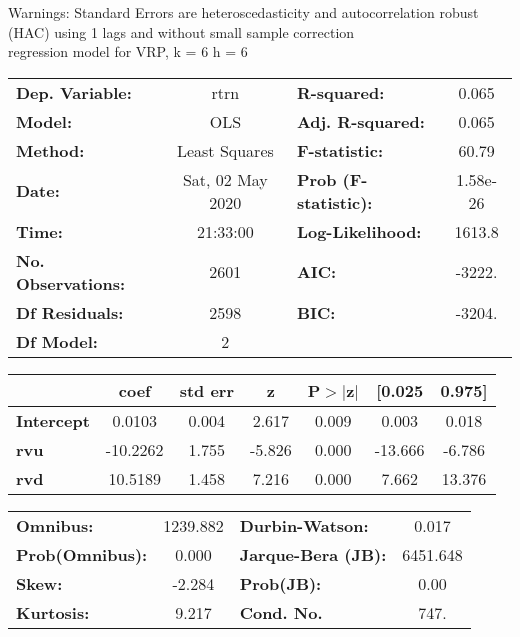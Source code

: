Warnings: \newline
 [1] Standard Errors are heteroscedasticity and autocorrelation robust (HAC) using 1 lags and without small sample correction\\ 

regression model for VRP, k = 6 h = 6\begin{center}
\begin{tabular}{lclc}
\toprule
\textbf{Dep. Variable:}    &       rtrn       & \textbf{  R-squared:         } &     0.065   \\
\textbf{Model:}            &       OLS        & \textbf{  Adj. R-squared:    } &     0.065   \\
\textbf{Method:}           &  Least Squares   & \textbf{  F-statistic:       } &     60.79   \\
\textbf{Date:}             & Sat, 02 May 2020 & \textbf{  Prob (F-statistic):} &  1.58e-26   \\
\textbf{Time:}             &     21:33:00     & \textbf{  Log-Likelihood:    } &    1613.8   \\
\textbf{No. Observations:} &        2601      & \textbf{  AIC:               } &    -3222.   \\
\textbf{Df Residuals:}     &        2598      & \textbf{  BIC:               } &    -3204.   \\
\textbf{Df Model:}         &           2      & \textbf{                     } &             \\
\bottomrule
\end{tabular}
\begin{tabular}{lcccccc}
                   & \textbf{coef} & \textbf{std err} & \textbf{z} & \textbf{P$> |$z$|$} & \textbf{[0.025} & \textbf{0.975]}  \\
\midrule
\textbf{Intercept} &       0.0103  &        0.004     &     2.617  &         0.009        &        0.003    &        0.018     \\
\textbf{rvu}       &     -10.2262  &        1.755     &    -5.826  &         0.000        &      -13.666    &       -6.786     \\
\textbf{rvd}       &      10.5189  &        1.458     &     7.216  &         0.000        &        7.662    &       13.376     \\
\bottomrule
\end{tabular}
\begin{tabular}{lclc}
\textbf{Omnibus:}       & 1239.882 & \textbf{  Durbin-Watson:     } &    0.017  \\
\textbf{Prob(Omnibus):} &   0.000  & \textbf{  Jarque-Bera (JB):  } & 6451.648  \\
\textbf{Skew:}          &  -2.284  & \textbf{  Prob(JB):          } &     0.00  \\
\textbf{Kurtosis:}      &   9.217  & \textbf{  Cond. No.          } &     747.  \\
\bottomrule
\end{tabular}
\end{center}

